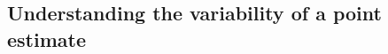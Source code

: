 %




\subsection{Understanding the variability of a point estimate}
\label{simulationForUnderstandingVariabilitySection}

\newcommand{\pewsolarpollsize}{1000}
\newcommand{\pewsolarparprop}{0.88}
\newcommand{\pewsolarparpropcomplement}{0.12}
\newcommand{\pewsolarparpercent}{88\%}
\newcommand{\pewsolarparpercentcomplement}{12\%}
\newcommand{\pewsolarpollprop}{0.887}
\newcommand{\pewsolarpollpropcomplement}{0.113}
\newcommand{\pewsolarpollpercent}{88.7\%}
\newcommand{\pewsolarpollpercentcomplement}{11.3\%}
\newcommand{\pewsolarpollcount}{887}
\newcommand{\pewsolarpollexpcount}{880}
\newcommand{\pewsolarpollcountcomplement}{113}
\newcommand{\pewsolarpollexpcountcomplement}{120}
\newcommand{\pewsolarpollse}{0.010}

